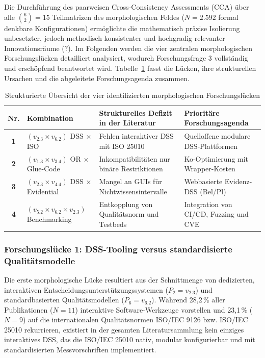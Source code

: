 Die Durchführung des paarweisen Cross-Consistency Assessments (CCA) über alle $\binom{6}{2} = 15$ Teilmatrizen des morphologischen Feldes ($N = 2.592$ formal denkbare Konfigurationen) ermöglichte die mathematisch präzise Isolierung unbesetzter, jedoch methodisch konsistenter und hochgradig relevanter Innovationsräume ($?$). Im Folgenden werden die vier zentralen morphologischen Forschungslücken detailliert analysiert, wodurch Forschungsfrage 3 vollständig und erschöpfend beantwortet wird. Tabelle~\ref{tab:morphologische_luecken} fasst die Lücken, ihre strukturellen Ursachen und die abgeleitete Forschungsagenda zusammen.

\begin{table}[htbp]
  \centering
  \small
  \caption{Strukturierte Übersicht der vier identifizierten morphologischen Forschungslücken}
  \label{tab:morphologische_luecken}
  \begin{tabularx}{\textwidth}{cl>{\raggedright\arraybackslash}p{4.4cm}>{\raggedright\arraybackslash}X}
    \toprule
    \textbf{Nr.} & \textbf{Kombination} & \textbf{Strukturelles Defizit in der Literatur} & \textbf{Prioritäre Forschungsagenda} \\
    \midrule
    \textbf{1} & $(v_{2.3} \times v_{6.2})$ DSS $\times$ ISO & Fehlen interaktiver DSS mit ISO 25010 & Quelloffene modulare DSS-Plattformen \\
    \textbf{2} & $(v_{1.3} \times v_{3.4})$ OR $\times$ Glue-Code & Inkompatibilitäten nur binäre Restriktionen & Ko-Optimierung mit Wrapper-Kosten \\
    \textbf{3} & $(v_{2.3} \times v_{4.4})$ DSS $\times$ Evidential & Mangel an GUIs für Nichtwissensintervalle & Webbasierte Evidenz-DSS (Bel/Pl) \\
    \textbf{4} & $(v_{5.2} \times v_{6.2} \times v_{2.3})$ Benchmarking & Entkopplung von Qualitätsnorm und Testbeds & Integration von CI/CD, Fuzzing und CVE \\
    \bottomrule
  \end{tabularx}
\end{table}

\subsubsection{Forschungslücke 1: DSS-Tooling versus standardisierte Qualitätsmodelle}
\label{subsubsec:gap1}

Die erste morphologische Lücke resultiert aus der Schnittmenge von dedizierten, interaktiven Entscheidungsunterstützungssystemen ($P_2 = v_{2.3}$) und standardbasierten Qualitätsmodellen ($P_6 = v_{6.2}$). Während 28,2\,\% aller Publikationen ($N = 11$) interaktive Software-Werkzeuge vorstellen und 23,1\,\% ($N = 9$) auf die internationalen Qualitätsnormen ISO/IEC 9126 bzw. ISO/IEC 25010 rekurrieren, existiert in der gesamten Literatursammlung kein einziges interaktives DSS, das die ISO/IEC 25010 nativ, modular konfigurierbar und mit standardisierten Messvorschriften implementiert.

